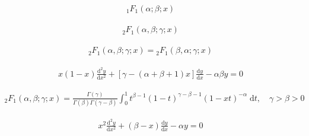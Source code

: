 \[\begin{align} \label{confluenthypergeo} {}_1F_1(\alpha ; \beta ; x) \end{align}\]

\[\begin{align} \label{diffeqsolution} {}_2F_1(\alpha , \beta ; \gamma ; x) \end{align}\]

\[\begin{align} \label{thrm9.2} {}_2F_1(\alpha , \beta ; \gamma ; x) = {}_2F_1(\beta , \alpha ; \gamma ; x) \end{align}\]

\[\begin{align} \label{thrm9.3} x(1-x)\frac{\mathrm d^2 y}{\mathrm d x^2} + [\gamma - (\alpha + \beta + 1)x]\frac{\mathrm d y}{\mathrm d x} - \alpha\beta y = 0 \end{align}\]

\[\begin{align} \label{thrm9.4} {}_2F_1(\alpha , \beta ; \gamma ; x) = \frac{\Gamma(\gamma)}{\Gamma(\beta)\Gamma(\gamma-\beta)}\int_0^1t^{\beta-1}(1-t)^{\gamma-\beta-1}(1-xt)^{-\alpha}\; \mathrm dt,\quad \gamma>\beta>0 \end{align}\]

\[\begin{align} \label{thrm9.6} x^2\frac{\mathrm d^2 y}{\mathrm d x^2} + (\beta-x)\frac{\mathrm d y}{\mathrm d x} - \alpha y = 0 \end{align}\]

